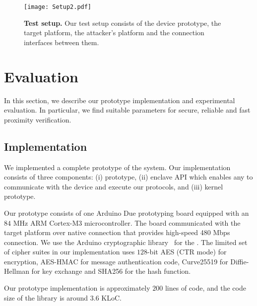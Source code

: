 \begin{figure}[t]
  \centering
    \texttt{[image: Setup2.pdf]}
    \caption{\textbf{Test setup.} Our test setup consists of the \device device prototype, the target platform, the attacker's platform and the connection interfaces between them.}
   \vspace{-15px}
    \label{fig:setup}
\end{figure}

\section{Evaluation}
\label{sec:evaluation}

In this section, we describe our prototype implementation and experimental evaluation. In particular, we find suitable parameters for secure, reliable and fast proximity verification.

\subsection{Implementation}
\label{sec:evaluation:implementation}

We implemented a complete prototype of the \name system. Our implementation consists of three components: (i) \device prototype, (ii) \name enclave API which enables any \app to communicate with the \device device and execute our protocols, and (iii) \name kernel prototype.

\ifusenix
\vspace{-12pt}
\else
\fi
{} Our \device prototype consists of one Arduino Due prototyping board equipped with an $84$ MHz ARM Cortex-M3 microcontroller. %
The board communicated with the target platform over native  connection that provides high-speed 480 Mbps connection.%
%
We use the Arduino cryptographic library~\cite{ardCrypto} for the \tls. The limited set of cipher suites in our implementation uses $128$-bit AES (CTR mode) for encryption, AES-HMAC for message authentication code,  Curve25519 for Diffie-Hellman for key exchange and SHA256 for the hash function.

Our prototype implementation is approximately $200$ lines of code, and the code size of the \tls library is around $3.6$ KLoC.




